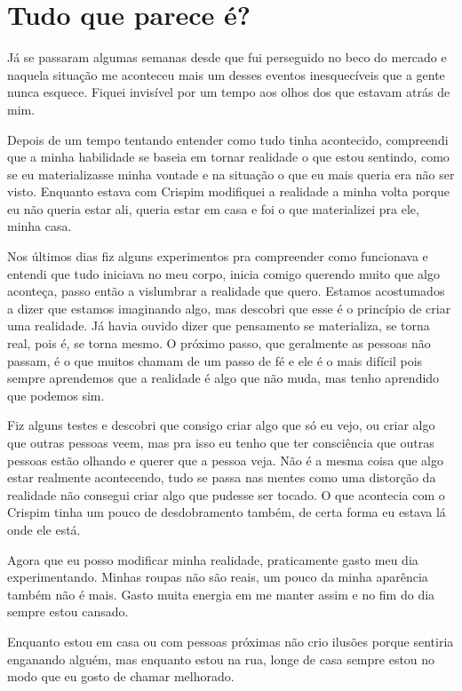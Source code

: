 \chapter{Tudo que parece é?}


Já se passaram algumas semanas desde que fui perseguido no beco do mercado e naquela situação me aconteceu mais um desses eventos inesquecíveis que a gente nunca esquece. Fiquei invisível por um tempo aos olhos dos que estavam atrás de mim. 

Depois de um tempo tentando entender como tudo tinha acontecido, compreendi que a minha habilidade se baseia em tornar realidade o que estou sentindo, como se eu materializasse minha vontade e na situação o que eu mais queria era não ser visto. Enquanto estava com Crispim modifiquei a realidade a minha volta porque eu não queria estar ali, queria estar em casa e foi o que materializei pra ele, minha casa.

Nos últimos dias fiz alguns experimentos pra compreender como funcionava e entendi que tudo iniciava no meu corpo, inicia comigo querendo muito que algo aconteça, passo então a vislumbrar a realidade que quero. Estamos acostumados a dizer que estamos imaginando algo, mas descobri que esse é o princípio de criar uma realidade. Já havia ouvido dizer que pensamento se materializa, se torna real, pois é, se torna mesmo. O próximo passo, que geralmente as pessoas não passam, é o que muitos chamam de um passo de fé e ele é o mais difícil pois sempre aprendemos que a realidade é algo que não muda, mas tenho aprendido que podemos sim.

Fiz alguns testes e descobri que consigo criar algo que só eu vejo, ou criar algo que outras pessoas veem, mas pra isso eu tenho que ter consciência que outras pessoas estão olhando e querer que a pessoa veja. Não é a mesma coisa que algo estar realmente acontecendo, tudo se passa nas mentes como uma distorção da realidade não consegui criar algo que pudesse ser tocado. O que acontecia com o Crispim tinha um pouco de desdobramento também, de certa forma eu estava lá onde ele está.

Agora que eu posso modificar minha realidade, praticamente gasto meu dia experimentando. Minhas roupas não são reais, um pouco da minha aparência também não é mais. Gasto muita energia em me manter assim e no fim do dia sempre estou cansado.

Enquanto estou em casa ou com pessoas próximas não crio ilusões porque sentiria enganando alguém, mas enquanto estou na rua, longe de casa sempre estou no modo que eu gosto de chamar melhorado. 

